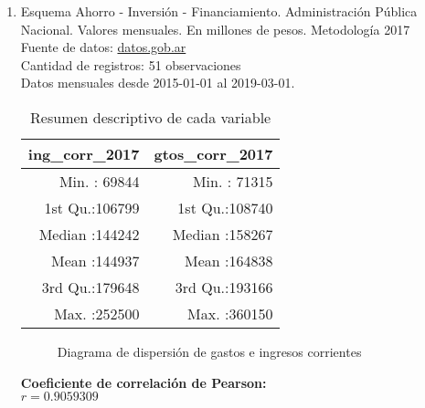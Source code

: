 \documentclass[12pt,letterpaper,fleqn]{article}
\begin{document}
\begin{enumerate}[label=\textbf{\arabic*.}]
        \item
            Esquema Ahorro - Inversión - Financiamiento. Administración Pública Nacional. Valores mensuales. En millones de pesos. Metodología 2017  \\
            Fuente de datos: \href{https://datos.gob.ar/dataset/sspm-esquema-ahorro---inversion---financimmiento-administracion-publica-nacional-base-caja/archivo/sspm_372.9}{datos.gob.ar} \\

            Cantidad de registros: 51 observaciones \\
            Datos mensuales desde 2015-01-01 al 2019-03-01. \\

            \begin{table}[ht]
                \centering
                \caption{Resumen descriptivo de cada variable}
                \begin{threeparttable}
                    \begin{tabular}{|r|r|}
                      \hline
                      ing\_corr\_2017   & gtos\_corr\_2017 \\
                      \hline
                      Min.   : 69844    & Min.   : 71315   \\
                      1st Qu.:106799    & 1st Qu.:108740   \\
                      Median :144242    & Median :158267   \\
                      Mean   :144937    & Mean   :164838   \\
                      3rd Qu.:179648    & 3rd Qu.:193166   \\
                      Max.   :252500    & Max.   :360150   \\
                       \hline
                    \end{tabular}
                \end{threeparttable}
            \end{table}


            \begin{figure}[!htb]
                \centering
                
                \caption{Diagrama de dispersión de gastos e ingresos corrientes}
                \label{fig:figure6}
            \end{figure}

            \textbf{Coeficiente de correlación de Pearson:} \\
            $ r = 0.9059309 $ \\


\end{enumerate}
\end{document}
